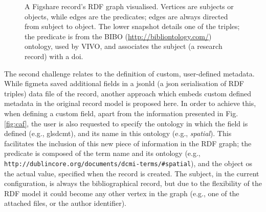 \begin{figure}[thpb]
  \centering
  \caption{A Figshare record's RDF graph visualised. Vertices are subjects or objects, while edges are the predicates; edges are always directed from subject to object. The lower snapshot details one of the triples; the predicate is  from the BIBO (\url{http://bibliontology.com/}) ontology, used by VIVO, and associates the subject (a research record) with a \gls{doi}.}
  \label{fig:graph}
\end{figure}

The second challenge relates to the definition of custom, user-defined metadata. While figmeta saved additional fields in a \gls{jsonld} (a  \gls{json} serialisation of RDF triples) data file of the record, another approach which embeds custom defined metadata in the original record
model is proposed here. In order to achieve this, when defining a custom field, apart from the information presented in Fig. \ref{fig:caf}, the user is also requested to specify the ontology in which the field is defined (e.g., gls{dcmt}), and its name in this ontology (e.g., \emph{spatial}). This facilitates the inclusion of this new piece of information in the RDF graph; the predicate is composed of the term name and its ontology (e.g., \nolinkurl{http://dublincore.org/documents/dcmi-terms/#spatial}), and the object os the actual value, specified when the record is created. The subject, in the current configuration, is always the bibliographical record, but due to the flexibility of the RDF model it could become any other vertex in the graph (e.g., one of the attached files, or the author identifier).

